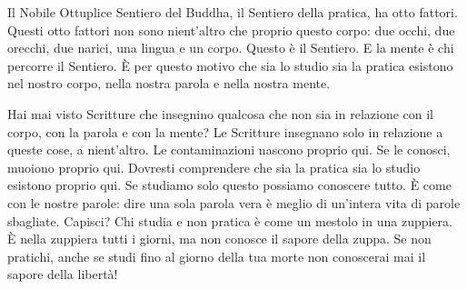 Il Nobile Ottuplice Sentiero del Buddha, il Sentiero della pratica, ha
otto fattori. Questi otto fattori non sono nient'altro che proprio
questo corpo: due occhi, due orecchi, due narici, una lingua e un corpo.
Questo è il Sentiero. E la mente è chi percorre il Sentiero. È per
questo motivo che sia lo studio sia la pratica esistono nel nostro
corpo, nella nostra parola e nella nostra mente.

Hai mai visto Scritture che insegnino qualcosa che non sia in relazione
con il corpo, con la parola e con la mente? Le Scritture insegnano solo
in relazione a queste cose, a nient'altro. Le contaminazioni nascono
proprio qui. Se le conosci, muoiono proprio qui. Dovresti comprendere
che sia la pratica sia lo studio esistono proprio qui. Se studiamo solo
questo possiamo conoscere tutto. È come con le nostre parole: dire una
sola parola vera è meglio di un'intera vita di parole sbagliate.
Capisci? Chi studia e non pratica è come un mestolo in una zuppiera. È
nella zuppiera tutti i giorni, ma non conosce il sapore della zuppa. Se
non pratichi, anche se studi fino al giorno della tua morte non
conoscerai mai il sapore della libertà!

